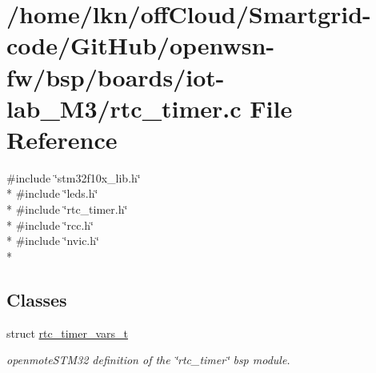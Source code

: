 \hypertarget{iot-lab___m3_2rtc__timer_8c}{}\section{/home/lkn/off\+Cloud/\+Smartgrid-\/code/\+Git\+Hub/openwsn-\/fw/bsp/boards/iot-\/lab\+\_\+\+M3/rtc\+\_\+timer.c File Reference}
\label{iot-lab___m3_2rtc__timer_8c}
{\ttfamily \#include \char`\"{}stm32f10x\+\_\+lib.\+h\char`\"{}}\\*
{\ttfamily \#include \char`\"{}leds.\+h\char`\"{}}\\*
{\ttfamily \#include \char`\"{}rtc\+\_\+timer.\+h\char`\"{}}\\*
{\ttfamily \#include \char`\"{}rcc.\+h\char`\"{}}\\*
{\ttfamily \#include \char`\"{}nvic.\+h\char`\"{}}\\*
\subsection*{Classes}
\begin{DoxyCompactItemize}
\item 
struct \hyperlink{structrtc__timer__vars__t}{rtc\+\_\+timer\+\_\+vars\+\_\+t}
\begin{DoxyCompactList}\small\item\em openmote\+S\+T\+M32 definition of the \char`\"{}rtc\+\_\+timer\char`\"{} bsp module. \end{DoxyCompactList}\end{DoxyCompactItemize}
